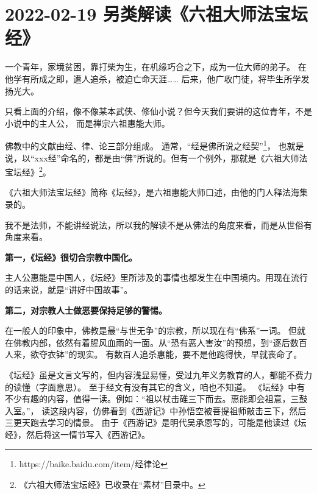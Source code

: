 \section{2022-02-19 另类解读《六祖大师法宝坛经》}

一个青年，家境贫困，靠打柴为生，在机缘巧合之下，成为一位大师的弟子。
在他学有所成之即，遭人追杀，被迫亡命天涯…… 后来，他广收门徒，将毕生所学发扬光大。

只看上面的介绍，像不像某本武侠、修仙小说？但今天我们要讲的这位青年，不是小说中的主人公，
而是禅宗六祖惠能大师。

佛教中的文献由经、律、论三部分组成。
通常，“经是佛所说之经契”\footnote{https://baike.baidu.com/item/经律论}，
也就是说，以“xxx经”命名的，都是由“佛”所说的。但有一个例外，那就是《六祖大师法宝坛经》\footnote{《六祖大师法宝坛经》已收录在“素材”目录中。}。

《六祖大师法宝坛经》简称《坛经》，是六祖惠能大师口述，由他的门人释法海集录的。

我不是法师，不能讲经说法，所以我的解读不是从佛法的角度来看，而是从世俗有角度来看。

\textbf{第一，《坛经》很切合宗教中国化。}

主人公惠能是中国人，《坛经》里所涉及的事情也都发生在中国境内。用现在流行的话来说，就是“讲好中国故事”。

\textbf{第二，对宗教人士做恶要保持足够的警惕。}

在一般人的印象中，佛教是最“与世无争”的宗教，所以现在有“佛系”一词。
但就在佛教内部，依然有着腥风血雨的一面。从“恐有恶人害汝”的预想，到“逐后数百人来，欲夺衣钵”的现实。
有数百人追杀惠能，要不是他跑得快，早就丧命了。

《坛经》虽是文言文写的，但内容浅显易懂，受过九年义务教育的人，都能不费力的读懂（字面意思）。
至于经文有没有其它的含义，咱也不知道。
《坛经》中有不少有趣的内容，值得一读。例如：“祖以杖击碓三下而去。惠能即会祖意，三鼓入室。”，
读这段内容，仿佛看到《西游记》中孙悟空被菩提祖师敲击三下，然后三更天跑去学习的情景。
由于《西游记》是明代吴承恩写的，可能是他读过《坛经》，然后将这一情节写入《西游记》。

